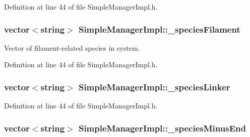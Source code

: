 Definition at line 44 of file Simple\+Manager\+Impl.\+h.

\hypertarget{classSimpleManagerImpl_a6842452647356333fa3a8dfc9daad925}{
\subsubsection[{\+\_\+species\+Filament}]{\setlength{\rightskip}{0pt plus 5cm}vector$<$string$>$ Simple\+Manager\+Impl\+::\+\_\+species\+Filament\hspace{0.3cm}{\ttfamily [private]}}}\label{classSimpleManagerImpl_a6842452647356333fa3a8dfc9daad925}


Vector of filament-\/related species in system. 



Definition at line 44 of file Simple\+Manager\+Impl.\+h.

\hypertarget{classSimpleManagerImpl_ac5bb2d96109696dcd63109154f88c6be}{
\subsubsection[{\+\_\+species\+Linker}]{\setlength{\rightskip}{0pt plus 5cm}vector$<$string$>$ Simple\+Manager\+Impl\+::\+\_\+species\+Linker\hspace{0.3cm}{\ttfamily [private]}}}\label{classSimpleManagerImpl_ac5bb2d96109696dcd63109154f88c6be}


Definition at line 44 of file Simple\+Manager\+Impl.\+h.

\hypertarget{classSimpleManagerImpl_a07794aeec638f61758d22f7ba3b2d5b4}{
\subsubsection[{\+\_\+species\+Minus\+End}]{\setlength{\rightskip}{0pt plus 5cm}vector$<$string$>$ Simple\+Manager\+Impl\+::\+\_\+species\+Minus\+End\hspace{0.3cm}{\ttfamily [private]}}}\label{classSimpleManagerImpl_a07794aeec638f61758d22f7ba3b2d5b4}


